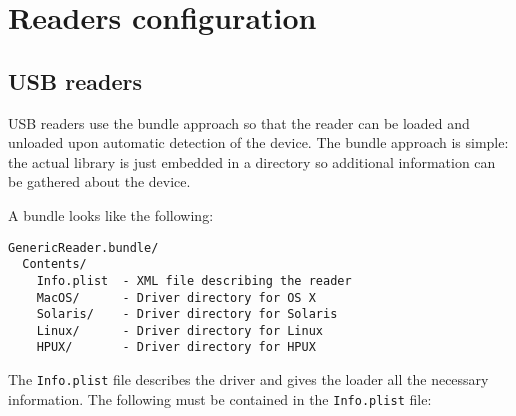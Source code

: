 \documentclass[a4paper,12pt]{article}
\begin{document}
\section{Readers configuration}


\subsection{USB readers}

USB readers use the bundle approach so that the reader can be loaded and
unloaded upon automatic detection of the device. The bundle approach is
simple: the actual library is just embedded in a directory so additional
information can be gathered about the device.

A bundle looks like the following:

\begin{verbatim}
GenericReader.bundle/
  Contents/
    Info.plist  - XML file describing the reader
    MacOS/      - Driver directory for OS X
    Solaris/    - Driver directory for Solaris
    Linux/      - Driver directory for Linux
    HPUX/       - Driver directory for HPUX
\end{verbatim}

The \texttt{Info.plist} file describes the driver and gives the loader all
the necessary information. The following must be contained in the
\texttt{Info.plist} file:
\end{document}
